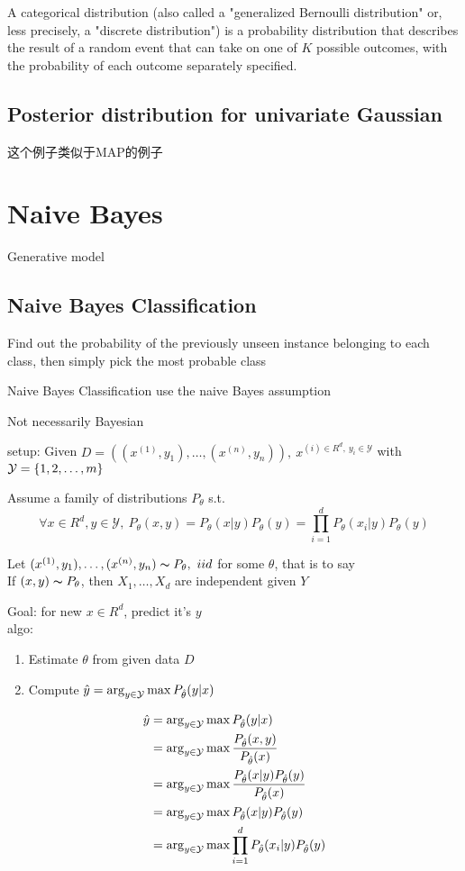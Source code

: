 \documentclass{article}
\begin{document}
A categorical distribution (also called a "generalized Bernoulli distribution" or, less precisely, a "discrete distribution") 
is a probability distribution that describes the result of a random event that can take on one of $K$ possible outcomes, 
with the probability of each outcome separately specified.

\subsection{Posterior distribution for univariate Gaussian}
这个例子类似于MAP的例子

\section{Naive Bayes}
Generative model
\subsection{Naive Bayes Classification}
Find out the probability of the previously unseen instance belonging to each class, then simply pick the most probable class

Naive Bayes Classification use the naive Bayes assumption

Not necessarily Bayesian

setup: Given $D = ((x^{(1)}, y_1), \ldots, (x^{(n)}, y_n)),\ x^{(i) \in R^d,\ y_i \in \mathcal{Y}}$ with $\mathcal{Y} = \{1,2,\ldots, m\}$

Assume a family of distributions $P_\theta$ s.t.
$$\forall x \in R^d, y \in \mathcal{Y},\ P_\theta(x,y) = P_\theta(x|y) P_\theta(y) = \prod_{i=1}^d P_\theta(x_i|y) P_\theta(y)$$

Let $(x^{(1)}, y_1), \ldots, (x^{(n)}, y_n) \thicksim{P}_\theta,\ iid$ for some $\theta$, that is to say\\
If $(x,y) \thicksim{P}_\theta$, then $X_1, \ldots, X_d$ are independent given $Y$

Goal: for new $x \in R^d$, predict it's $y$\\
algo: 
\begin{enumerate}
\item Estimate $\theta$ from given data $D$
\item Compute $\hat{y} = \arg_{y \in \mathcal{Y}} \max P_{\hat{\theta}}(y|x)$
\end{enumerate}

$$
\begin{aligned}
\hat{y} 
& = \arg_{y \in \mathcal{Y}} \max P_{\hat{\theta}}(y|x) \\
& = \arg_{y \in \mathcal{Y}} \max \dfrac{P_{\hat{\theta}} (x,y)}{ P_{\hat{\theta}}(x) } \\
& = \arg_{y \in \mathcal{Y}} \max \dfrac{P_{\hat{\theta}} (x|y) P_{\hat{\theta}}(y)}{ P_{\hat{\theta}}(x) } \\
& = \arg_{y \in \mathcal{Y}} \max P_{\hat{\theta}} (x|y) P_{\hat{\theta}}(y) \\
& = \arg_{y \in \mathcal{Y}} \max \prod_{i=1}^d P_{\hat{\theta}} (x_i|y) P_{\hat{\theta}}(y) \\
\end{aligned}
$$
\end{document}
